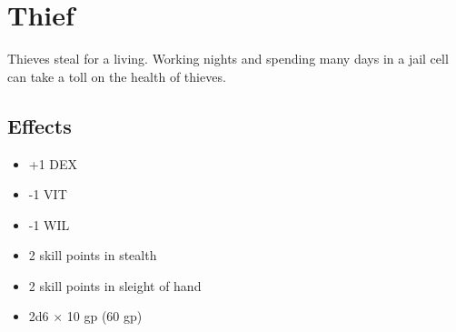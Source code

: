 \section{Thief}\label{background:thief}
Thieves steal for a living. Working nights and spending many days in a jail
cell can take a toll on the health of thieves.

\subsection*{Effects}
\begin{itemize}
    \item +1 DEX
    \item -1 VIT
    \item -1 WIL
    \item 2 skill points in stealth
    \item 2 skill points in sleight of hand
    \item 2d6 $\times$ 10 gp (60 gp)
\end{itemize}
